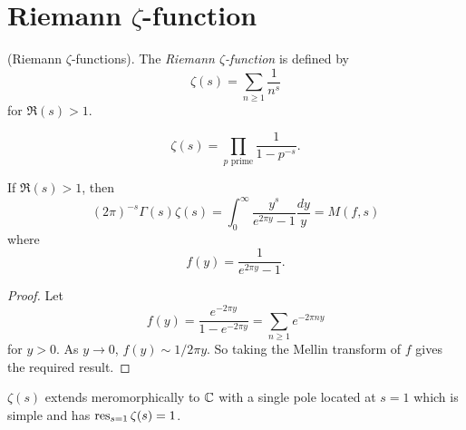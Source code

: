 \documentclass{memoir}
\begin{document}
\section{Riemann $\zeta$-function}
\begin{definition}
    (Riemann $\zeta$-functions).
    The \textit{Riemann $\zeta$-function} is defined by
    \begin{equation}
        \zeta(s) = \sum_{n\ge1}\frac1{n^s}
    \end{equation}
    for $\Re(s)>1$.
\end{definition}
\begin{proposition}
    \begin{equation}
        \zeta(s) = \prod_{p \text{ prime}}\frac1{1-p^{-s}}.
    \end{equation}
\end{proposition}
\begin{thm}
    If $\Re(s)>1$, then
    \begin{equation}
        (2\pi)^{-s}\Gamma(s)\zeta(s) = \int_0^\infty\frac{y^s}{e^{2\pi y}-1} \frac{dy}y = M(f,s)
    \end{equation}
    where 
    \begin{equation}
        f(y) = \frac1{e^{2\pi y} - 1}.
    \end{equation}
\end{thm}
\begin{proof}
    Let 
    \begin{equation}
        f(y) = \frac{e^{-2\pi y}}{1-e^{-2\pi y}} = \sum_{n\ge1} e^{-2\pi ny}
    \end{equation}
    for $y>0$.
    As $y\to 0$, $f(y) \sim 1/2\pi y$. 
    So taking the Mellin transform of $f$ gives the required result.
\end{proof}
\begin{corollary}
    $\zeta(s)$ extends meromorphically to $\mathbb{C}$ with a single pole located at $s=1$ which is simple and has $\operatorname{res}_{s=1}\zeta(s) = 1$.
\end{corollary}
\end{document}
